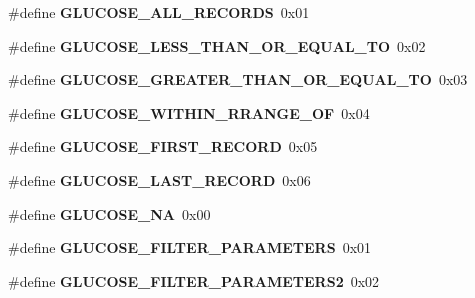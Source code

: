 \begin{DoxyCompactItemize}
\item 
\#define {\bfseries G\+L\+U\+C\+O\+S\+E\+\_\+\+A\+L\+L\+\_\+\+R\+E\+C\+O\+R\+DS}~0x01\hypertarget{group___b_l_e___g_s_ga6b16faa2992eb4371905e1a4e0d27823}{}\label{group___b_l_e___g_s_ga6b16faa2992eb4371905e1a4e0d27823}

\item 
\#define {\bfseries G\+L\+U\+C\+O\+S\+E\+\_\+\+L\+E\+S\+S\+\_\+\+T\+H\+A\+N\+\_\+\+O\+R\+\_\+\+E\+Q\+U\+A\+L\+\_\+\+TO}~0x02\hypertarget{group___b_l_e___g_s_ga1659df49b4b2163091118124b2ab8fe2}{}\label{group___b_l_e___g_s_ga1659df49b4b2163091118124b2ab8fe2}

\item 
\#define {\bfseries G\+L\+U\+C\+O\+S\+E\+\_\+\+G\+R\+E\+A\+T\+E\+R\+\_\+\+T\+H\+A\+N\+\_\+\+O\+R\+\_\+\+E\+Q\+U\+A\+L\+\_\+\+TO}~0x03\hypertarget{group___b_l_e___g_s_gaf36a69122b65903027552ad5b2ae0bbf}{}\label{group___b_l_e___g_s_gaf36a69122b65903027552ad5b2ae0bbf}

\item 
\#define {\bfseries G\+L\+U\+C\+O\+S\+E\+\_\+\+W\+I\+T\+H\+I\+N\+\_\+\+R\+R\+A\+N\+G\+E\+\_\+\+OF}~0x04\hypertarget{group___b_l_e___g_s_ga248606a12d2e232da0d9674b90dc93cc}{}\label{group___b_l_e___g_s_ga248606a12d2e232da0d9674b90dc93cc}

\item 
\#define {\bfseries G\+L\+U\+C\+O\+S\+E\+\_\+\+F\+I\+R\+S\+T\+\_\+\+R\+E\+C\+O\+RD}~0x05\hypertarget{group___b_l_e___g_s_ga132fb7a8a95546be14eac2324c0c9578}{}\label{group___b_l_e___g_s_ga132fb7a8a95546be14eac2324c0c9578}

\item 
\#define {\bfseries G\+L\+U\+C\+O\+S\+E\+\_\+\+L\+A\+S\+T\+\_\+\+R\+E\+C\+O\+RD}~0x06\hypertarget{group___b_l_e___g_s_ga50fd013f7cd8fb49609f89a02adaa54c}{}\label{group___b_l_e___g_s_ga50fd013f7cd8fb49609f89a02adaa54c}

\item 
\#define {\bfseries G\+L\+U\+C\+O\+S\+E\+\_\+\+NA}~0x00\hypertarget{group___b_l_e___g_s_ga31414b0559613b97e87ce314d6be334a}{}\label{group___b_l_e___g_s_ga31414b0559613b97e87ce314d6be334a}

\item 
\#define {\bfseries G\+L\+U\+C\+O\+S\+E\+\_\+\+F\+I\+L\+T\+E\+R\+\_\+\+P\+A\+R\+A\+M\+E\+T\+E\+RS}~0x01\hypertarget{group___b_l_e___g_s_gabe9365b31be087edb927dc18513af08c}{}\label{group___b_l_e___g_s_gabe9365b31be087edb927dc18513af08c}

\item 
\#define {\bfseries G\+L\+U\+C\+O\+S\+E\+\_\+\+F\+I\+L\+T\+E\+R\+\_\+\+P\+A\+R\+A\+M\+E\+T\+E\+R\+S2}~0x02\hypertarget{group___b_l_e___g_s_ga7e832dff997c953b1ab6e63c3478df02}{}\label{group___b_l_e___g_s_ga7e832dff997c953b1ab6e63c3478df02}


\end{DoxyCompactItemize}
